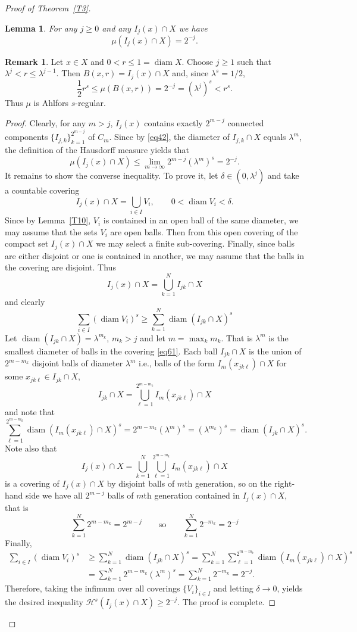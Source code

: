\documentclass[12pt,leqno]{amsart}
\newtheorem{lemma}[theorem]{Lemma}
\theoremstyle{definition}
\newtheorem{remark}[theorem]{Remark}
\def\diam{\operatorname{diam}}
\def\H{{\mathcal H}}
\numberwithin{theorem}{section} \numberwithin{equation}{section}
\begin{document}
\begin{proof}[Proof of Theorem~\ref{T3}]
\begin{lemma}
\label{hausd1}
For any $j \geq 0$ and any
$ I_{j}(x) \cap X  $ we have
$$
\mu(I_{j}(x) \cap X) = 2^{-j}.
$$
\end{lemma}
\begin{remark}
Let $x\in X$ and $0<r\leq1=\diam X$. Choose $j\geq1$ such that
$\lambda^j<r\leq\lambda^{j-1}$. Then $B(x,r)=I_j(x)\cap X$ and,
since $\lambda^s=1/2$,
\[
\frac{1}{2} r^s\leq\mu(B(x,r))=2^{-j}=(\lambda^j)^s<r^s.
\]
Thus $\mu$ is Ahlfors $s$-regular.
\end{remark}
\begin{proof}
Clearly, for any $m>j$, $I_j(x)$ contains exactly $2^{m-j}$ connected components $\{ I_{j,k}\}_{k=1}^{2^{m-j}}$  of $C_m$. Since by \eqref{eq42}, the diameter of $I_{j,k}\cap X$ equals $\lambda^m$, the definition of the Hausdorff measure yields that
\[
\mu(I_j(x)\cap X)\leq\lim_{m\to\infty} 2^{m-j}(\lambda^m)^s=2^{-j}.
\]
It remains to show the converse inequality. To prove it, let $\delta\in (0,\lambda^j)$ and take a countable covering
\[
I_j(x)\cap X=\bigcup_{i\in I} V_i,
\qquad
0<\diam V_i<\delta.
\]
Since by Lemma~\ref{T10}, $V_i$ is contained in an open ball of the same diameter, we may assume that the sets $V_i$ are open balls. Then from this open covering of the compact set $I_j(x)\cap X$ we may select a finite sub-covering. Finally, since balls are either disjoint or one is contained in another, we may assume that the balls in the covering are disjoint.
Thus
\begin{equation}
\label{eq61}
I_j(x)\cap X=\bigcup_{k=1}^N I_{jk}\cap X
\end{equation}
and clearly
\[
\sum_{i\in I} (\diam V_i)^s\geq \sum_{k=1}^N \diam (I_{jk}\cap X)^s
\]
Let $\diam(I_{jk}\cap X)=\lambda^{m_k}$, $m_k>j$ and let $m=\max_k m_k$. That is $\lambda^m$ is the smallest diameter of balls in the covering \eqref{eq61}.
Each ball $I_{jk}\cap X$ is the union of $2^{m-m_k}$ disjoint balls of diameter $\lambda^m$ i.e., balls of the form $I_m(x_{jk\ell})\cap X$ for some $x_{jk\ell}\in I_{jk}\cap X$,
\[
I_{jk}\cap X=\bigcup_{\ell=1}^{2^{m-m_k}} I_m(x_{jk\ell})\cap X
\]
and note that
\[
\sum_{\ell=1}^{2^{m-m_k}}\diam (I_m(x_{jk\ell})\cap X)^s
=2^{m-m_k}(\lambda^m)^s=(\lambda^{m_k})^s=\diam(I_{jk}\cap X)^s.
\]
Note also that
\[
I_j(x)\cap X=\bigcup_{k=1}^N \bigcup_{\ell=1}^{2^{m-m_k}} I_m(x_{jk\ell})\cap X
\]
is a covering of $I_j(x)\cap X$ by disjoint balls of $m$th generation, so on the right-hand side we have all $2^{m-j}$ balls of $m$th generation contained in $I_j(x)\cap X$, that is
\[
\sum_{k=1}^N 2^{m-m_k}=2^{m-j}
\qquad
\text{so}
\qquad
\sum_{k=1}^N 2^{-m_k}=2^{-j}
\]
Finally,
\[
\begin{split}
\sum_{i\in I}(\diam V_i)^s
&\geq
\sum_{k=1}^N\diam (I_{jk}\cap X)^s=
\sum_{k=1}^N\sum_{\ell=1}^{2^{m-m_k}}\diam(I_m(x_{jk\ell})\cap X)^s\\
&=
\sum_{k=1}^N 2^{m-m_k}(\lambda^m)^s=\sum_{k=1}^N2^{-m_k}=2^{-j}.
\end{split}
\]
Therefore, taking the infimum over all coverings $\{ V_i\}_{i\in I}$ and letting $\delta\to 0$, yields the desired inequality $\H^s(I_j(x)\cap X)\geq 2^{-j}$. The proof is complete.
\end{proof}


\end{proof}
\end{document}
